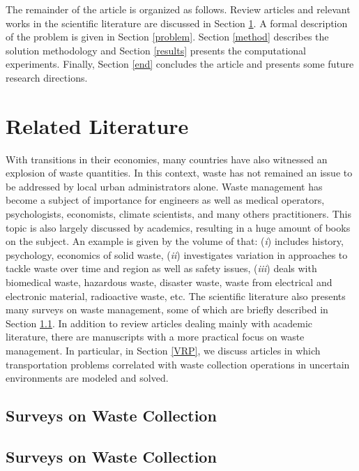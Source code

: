 \documentclass[authoryear,preprint,12pt]{elsarticle}
\begin{document}
The remainder of the article is organized as follows. Review articles and relevant works in the scientific literature are discussed in
Section \ref{literature}. A formal description of the problem is given in Section \ref{problem}. Section \ref{method} describes the solution methodology and Section \ref{results} presents the computational experiments. Finally, Section \ref{end} concludes
the article and presents some future research directions.

\section{Related Literature}\label{literature}
With transitions in their economies, many countries have also witnessed an explosion of waste quantities. In this context, waste has not remained an issue to be addressed by local urban administrators alone. Waste management has become a subject of importance for engineers as well as medical operators, psychologists, economists, climate scientists, and many others practitioners. This topic is also largely discussed by academics, resulting in a huge amount of books on the subject. An example is given by the volume of  \cite{Chandrappa2012} that: (\textit{i}) includes history, psychology, economics of solid waste, (\textit{ii}) investigates variation in approaches to tackle  waste over time and region as well as safety issues, (\textit{iii}) deals with biomedical waste, hazardous waste, disaster waste, waste from electrical and electronic material, radioactive waste, etc.   
%
The scientific literature also presents many surveys on waste management, some of which are briefly described in Section \ref{surveys}. In addition to review articles dealing mainly with academic literature, there are manuscripts with a more practical focus on waste management. In particular, in Section \ref{VRP}, we discuss articles in which transportation problems correlated with waste collection operations in uncertain environments are modeled and solved.  

\subsection{Surveys on Waste Collection}\label{surveys}


\subsection{Surveys on Waste Collection}
\end{document}

